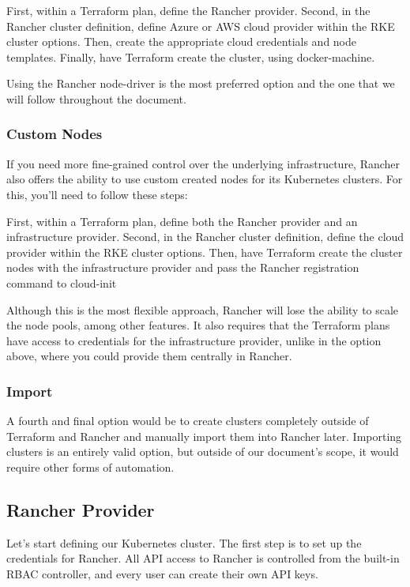 First, within a  Terraform plan, define the Rancher provider. Second, in the Rancher cluster definition, define Azure or AWS cloud provider within the RKE cluster options. Then, create the appropriate cloud credentials and node templates. Finally, have Terraform create the cluster, using docker-machine.

Using the Rancher node-driver is the most preferred option and the one that we will follow throughout the document.

\subsubsection{Custom Nodes}

If you need more fine-grained control over the underlying infrastructure, Rancher also offers the ability to use custom created nodes for its Kubernetes clusters. For this, you'll need to follow these steps:

First, within a  Terraform plan, define both the Rancher provider and an infrastructure provider. Second, in the Rancher cluster definition, define the cloud provider within the RKE cluster options. Then, have Terraform create the cluster nodes with the infrastructure provider and pass the Rancher registration command to cloud-init

Although this is the most flexible approach, Rancher will lose the ability to scale the node pools, among other features. It also requires that the Terraform plans have access to credentials for the infrastructure provider, unlike in the option above, where you could provide them centrally in Rancher.

\subsubsection{Import}

A fourth and final option would be to create clusters completely outside of Terraform and Rancher and manually import them into Rancher later. Importing clusters is an entirely valid option, but outside of our document's scope, it would require other forms of automation.

\subsection{Rancher Provider}

Let's start defining our Kubernetes cluster. The first step is to set up the credentials for Rancher. All API access to Rancher is controlled from the built-in RBAC controller, and every user can create their own API keys.

